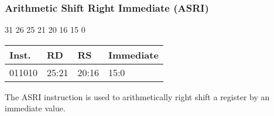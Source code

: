 \documentclass[12pt]{article}
\begin{document}



    \newpage
    \subsubsection{Arithmetic Shift Right Immediate (ASRI)}
    
    \hspace{1.6cm}31 \hspace{1.15cm}26 \hspace{.05cm}25 \hspace{.8cm}21 \hspace{.05cm}20 \hspace{.8cm}16 \hspace{.05cm}15 \hspace{6.4cm}0
    \vspace{-.25cm}
    \begin{center}
        \begin{tabular}{ |p{1.8cm}|p{1.5cm}|p{1.5cm}|p{6.8cm}| }
            \hline
            \textbf{Inst.} & \textbf{RD} &  \textbf{RS} & \textbf{Immediate}\\
            \hline
            011010& 25:21 & 20:16 &15:0\\
            \hline
        \end{tabular}
    \end{center}
    
    \noindent
    The ASRI instruction is used to arithmetically right shift a register by an immediate value. 
    
\end{document}
